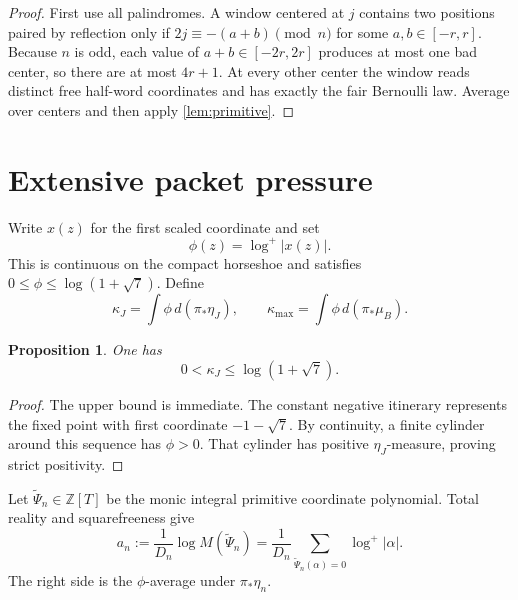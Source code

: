 \documentclass[11pt]{article}
\newtheorem{proposition}[theorem]{Proposition}
\theoremstyle{remark}
\newcommand{\Z}{\mathbb Z}
\newcommand{\logp}{\log^{+}}
\begin{document}
\begin{proof}
First use all palindromes.  A window centered at $j$ contains two positions
paired by reflection only if
$2j\equiv-(a+b)\pmod n$ for some $a,b\in[-r,r]$.  Because $n$ is odd,
each value of $a+b\in[-2r,2r]$ produces at most one bad center, so there are
at most $4r+1$.  At every other center the window reads distinct free
half-word coordinates and has exactly the fair Bernoulli law.  Average over
centers and then apply \cref{lem:primitive}.
\end{proof}

\section{Extensive packet pressure}

Write $x(z)$ for the first scaled coordinate and set
\begin{equation}\label{eq:phi}
 \phi(z)=\logp|x(z)|.
\end{equation}
This is continuous on the compact horseshoe and satisfies
$0\le\phi\le\log(1+\sqrt7)$.  Define
\begin{equation}\label{eq:kappas}
 \kappa_J=\int\phi\,d(\pi_*\eta_J),\qquad
 \kappa_{\max}=\int\phi\,d(\pi_*\mu_B).
\end{equation}

\begin{proposition}\label{prop:kappa-positive}
One has
\begin{equation}\label{eq:kappa-bound}
 0<\kappa_J\le\log(1+\sqrt7).
\end{equation}
\end{proposition}

\begin{proof}
The upper bound is immediate.  The constant negative itinerary represents
the fixed point with first coordinate $-1-\sqrt7$.  By continuity, a finite
cylinder around this sequence has $\phi>0$.  That cylinder has positive
$\eta_J$-measure, proving strict positivity.
\end{proof}

Let $\widetilde\Psi_n\in\Z[T]$ be the monic integral primitive coordinate
polynomial.  Total reality and squarefreeness give
\begin{equation}\label{eq:mahler}
 a_n:=\frac1{D_n}\log M(\widetilde\Psi_n)
 =\frac1{D_n}\sum_{\widetilde\Psi_n(\alpha)=0}\logp|\alpha|.
\end{equation}
The right side is the $\phi$-average under $\pi_*\eta_n$.
\end{document}
